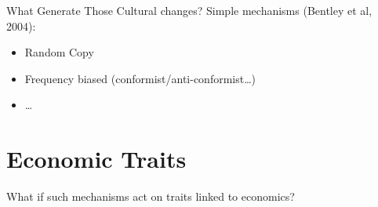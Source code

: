 \documentclass[10pt, notes=show]{beamer}
\begin{document}
\begin{frame}{What Generate Those Cultural changes?}
	Simple mechanisms (Bentley et al, 2004):
	\begin{itemize}
		\item<2->Random Copy 
		\item<3-> Frequency biased (conformist/anti-conformist\dots)
		\item<4->\dots	
	\end{itemize}
\end{frame}

\section{Economic Traits}


\begin{frame}
	\begin{center}
	    What if such mechanisms act on traits linked to economics?
	\end{center}
\end{frame}
\end{document}

